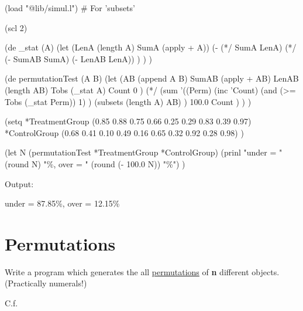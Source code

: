 \begin{wideverbatim}

(load "@lib/simul.l")  # For 'subsets'

(scl 2)

(de _stat (A)
   (let (LenA (length A)  SumA (apply + A))
      (-
         (*/ SumA LenA)
         (*/ (- SumAB SumA) (- LenAB LenA)) ) ) )

(de permutationTest (A B)
   (let
      (AB (append A B)
         SumAB (apply + AB)
         LenAB (length AB)
         Tobs (_stat A)
         Count 0 )
      (*/
         (sum
            '((Perm)
               (inc 'Count)
               (and (>= Tobs (_stat Perm)) 1) )
            (subsets (length A) AB) )
         100.0
         Count ) ) )

(setq
   *TreatmentGroup (0.85 0.88 0.75 0.66 0.25 0.29 0.83 0.39 0.97)
   *ControlGroup   (0.68 0.41 0.10 0.49 0.16 0.65 0.32 0.92 0.28 0.98) )

(let N (permutationTest *TreatmentGroup *ControlGroup)
   (prinl "under = " (round N) "\%, over = " (round (- 100.0 N)) "\%") )

Output:

under = 87.85\%, over = 12.15\%

\end{wideverbatim}

\pagebreak{}
\section*{Permutations}

Write a program which generates the all
\href{http://en.wikipedia.org/wiki/Permutation}{permutations} of
\textbf{n} different objects. (Practically numerals!)

C.f.

